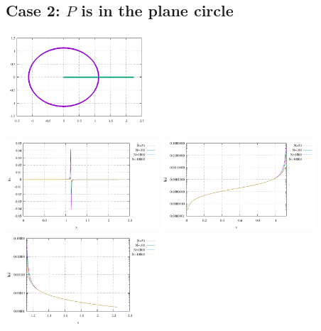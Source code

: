 \subsection*{Case 2: $P$ is in the plane circle}


\begin{center}
\includegraphics[width=5.7cm]{python_codes/fieldstone_132/results/setup.pdf}
\end{center}

\begin{center}
\includegraphics[width=5.7cm]{python_codes/fieldstone_132/results/gx.pdf}
\includegraphics[width=5.7cm]{python_codes/fieldstone_132/results/gx2.pdf}
\includegraphics[width=5.7cm]{python_codes/fieldstone_132/results/gx3.pdf}
\end{center}
